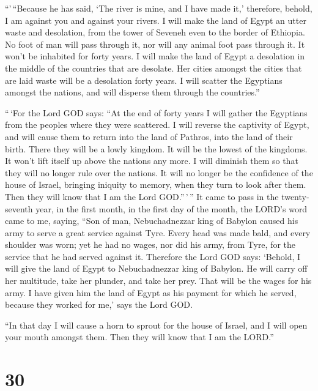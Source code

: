 ``'\,``Because he has said, `The river is mine, and I have made it,'
 therefore, behold, I am against you and against your
rivers. I will make the land of Egypt an utter waste and desolation,
from the tower of Seveneh even to the border of Ethiopia. 
No foot of man will pass through it, nor will any animal foot pass
through it. It won't be inhabited for forty years.  I will
make the land of Egypt a desolation in the middle of the countries that
are desolate. Her cities amongst the cities that are laid waste will be
a desolation forty years. I will scatter the Egyptians amongst the
nations, and will disperse them through the countries.''

 ``\,`For the Lord GOD says: ``At the end of forty years I
will gather the Egyptians from the peoples where they were scattered.
 I will reverse the captivity of Egypt, and will cause them
to return into the land of Pathros, into the land of their birth. There
they will be a lowly kingdom.  It will be the lowest of the
kingdoms. It won't lift itself up above the nations any more. I will
diminish them so that they will no longer rule over the nations.
 It will no longer be the confidence of the house of
Israel, bringing iniquity to memory, when they turn to look after them.
Then they will know that I am the Lord GOD.''\,'\,''  It
came to pass in the twenty-seventh year, in the first month, in the
first day of the month, the LORD's word came to me, saying,
 ``Son of man, Nebuchadnezzar king of Babylon caused his
army to serve a great service against Tyre. Every head was made bald,
and every shoulder was worn; yet he had no wages, nor did his army, from
Tyre, for the service that he had served against it. 
Therefore the Lord GOD says: `Behold, I will give the land of Egypt to
Nebuchadnezzar king of Babylon. He will carry off her multitude, take
her plunder, and take her prey. That will be the wages for his army.
 I have given him the land of Egypt as his payment for
which he served, because they worked for me,' says the Lord GOD.

 ``In that day I will cause a horn to sprout for the house
of Israel, and I will open your mouth amongst them. Then they will know
that I am the LORD.''

\hypertarget{section-28}{%
\section{30}\label{section-28}}

